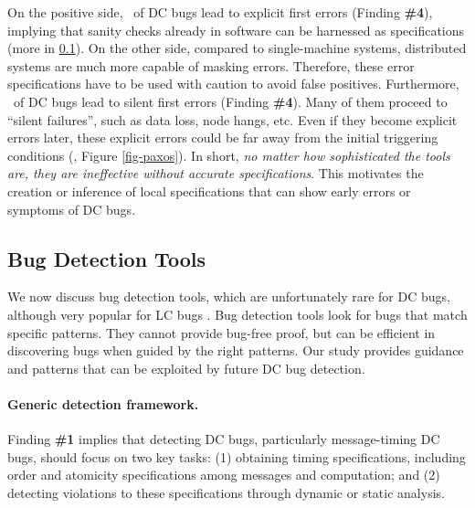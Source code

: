On the positive side, \pctErrExp\ of DC bugs lead to
explicit first errors (Finding {\bf \#4}), implying that sanity checks
already in software can be harnessed as 
specifications
(more in \sec\ref{less-det}). On the other side, compared to
single-machine systems, distributed systems are much more capable
of masking errors. Therefore, these error
specifications have to be used with caution to avoid false 
positives. Furthermore, 
\pctErrImp\ of DC bugs lead to silent first errors (Finding {\bf \#4}).
Many of them proceed to ``silent failures'', such as data loss,
node hangs, etc. Even if they become explicit
errors later, these explicit errors could be far away from the 
initial triggering conditions (\eg, Figure \ref{fig-paxos}).
In short, {\em no matter how sophisticated the tools are, they are
  ineffective without accurate specifications}.
%
This motivates the creation or inference of local specifications
that can show early errors or symptoms of DC bugs.


\subsection{Bug Detection Tools}
\label{less-det}


We now discuss bug detection tools, which are
unfortunately rare for DC bugs, although very popular for
LC bugs
%
\cite{pacer,
  flanagan09fasttrack, 
  satish.pldi14, 
  avio.asplos06, 
  madanpldi07,
  savage97eraser}.
%
Bug detection tools look for bugs that match specific patterns.  They
cannot provide bug-free proof, but can be efficient in discovering
bugs when guided by the right patterns.
Our study provides guidance and patterns that can be exploited by
future DC bug detection.

\paragraph{Generic detection framework.}

Finding {\bf \#1} implies that
detecting DC bugs, particularly message-timing DC bugs, should focus
on two key tasks: (1) obtaining timing specifications, including order
and atomicity specifications among messages and computation; and (2)
detecting violations to these specifications through dynamic or static
analysis.


